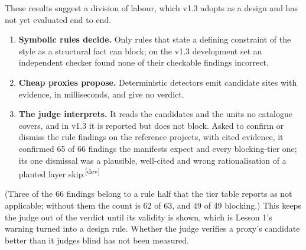 \documentclass[10pt,a4paper]{article}
\newcommand{\devset}{\textsuperscript{\textsf{\tiny[dev]}}}
\begin{document}
These results suggest a division of labour, which v1.3 adopts as a design and has not yet evaluated end to end.
\begin{enumerate}[leftmargin=*]
  \item \textbf{Symbolic rules decide.} Only rules that state a defining constraint of the style as a structural
        fact can block; on the v1.3 development set an independent checker found none of their checkable findings
        incorrect. %
  \item \textbf{Cheap proxies propose.} Deterministic detectors emit candidate sites with evidence, in
        milliseconds, and give no verdict. %
  \item \textbf{The judge interprets.} It reads the candidates and the units no catalogue covers, and in v1.3 it is
        reported but does not block. Asked to confirm or dismiss the rule findings on the reference projects, with
        cited evidence, it confirmed 65 of 66 findings the manifests expect and every blocking-tier one; its one
        dismissal was a plausible, well-cited and wrong rationalisation of a planted layer skip.\devset{}
\end{enumerate}
(Three of the 66 findings belong to a rule half that the tier table reports as not applicable; without them the
count is 62 of 63, and 49 of 49 blocking.) This keeps the judge out of the verdict until its validity is shown, which is Lesson 1's warning turned into a
design rule. Whether the judge verifies a proxy's candidate better than it judges blind has not been measured.
\end{document}
